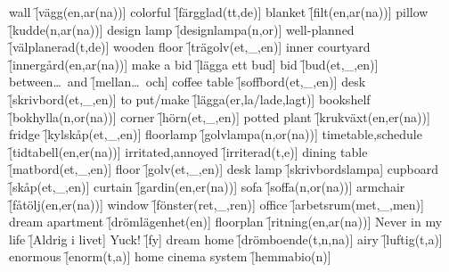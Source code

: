 \begin{questions}
\begin{multicols}{2}
        \question wall \f[vägg(en,ar(na))]
        \question colorful \f[färgglad(tt,de)]
        \question blanket \f[filt(en,ar(na))]
        \question pillow \f[kudde(n,ar(na))]
        \question design lamp \f[designlampa(n,or)]
        \question well-planned \f[välplanerad(t,de)]
        \question wooden floor \f[trägolv(et,\_,en)]
        \question inner courtyard \f[innergård(en,ar(na))]
        \question make a bid \f[lägga ett bud]
        \question bid \f[bud(et,\_,en)]
        \question between\ldots\ and \f[mellan\ldots\ och]
        \question coffee table \f[soffbord(et,\_,en)]
        \question desk \f[skrivbord(et,\_,en)]
        \question to put/make \f[lägga(er,la/lade,lagt)]
        \question bookshelf \f[bokhylla(n,or(na))]
        \question corner \f[hörn(et,\_,en)]
        \question potted plant \f[krukväxt(en,er(na))]
        \question fridge \f[kylskåp(et,\_,en)]
        \question floorlamp \f[golvlampa(n,or(na))]
        \question timetable,schedule \f[tidtabell(en,er(na))]
        \question irritated,annoyed \f[irriterad(t,e)]
        \question dining table \f[matbord(et,\_,en)]
        \question floor \f[golv(et,\_,en)]
        \question desk lamp \f[skrivbordslampa]
        \question cupboard \f[skåp(et,\_,en)]
        \question curtain \f[gardin(en,er(na))]
        \question sofa \f[soffa(n,or(na))]
        \question armchair \f[fåtölj(en,er(na))]
        \question window \f[fönster(ret,\_,ren)]
        \question office \f[arbetsrum(met,\_,men)]
        \question dream apartment \f[drömlägenhet(en)]
        \question floorplan \f[ritning(en,ar(na))]
        \question Never in my life \f[Aldrig i livet]
        \question Yuck! \f[fy]
        \question dream home \f[drömboende(t,n,na)]
        \question airy \f[luftig(t,a)]
        \question enormous \f[enorm(t,a)]
        \question home cinema system \f[hemmabio(n)]
    \end{multicols}
\end{questions}
